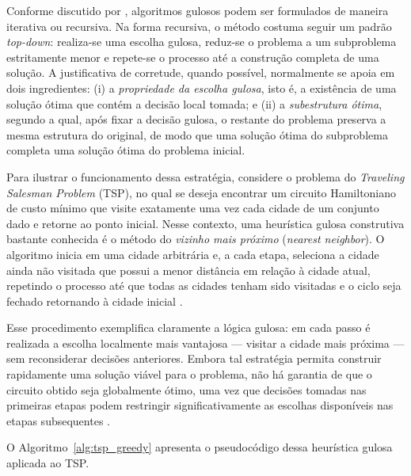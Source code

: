 Conforme discutido por \cite{Cormen2009}, algoritmos gulosos podem ser formulados de maneira iterativa ou recursiva. Na forma recursiva, o método costuma
seguir um padrão \textit{top-down}: realiza-se uma escolha gulosa, reduz-se o problema a um subproblema estritamente menor e repete-se o processo até a
construção completa de uma solução. A justificativa de corretude, quando possível, normalmente se apoia em dois ingredientes: (i) a \textit{propriedade da
escolha gulosa}, isto é, a existência de uma solução ótima que contém a decisão local tomada; e (ii) a \textit{subestrutura ótima}, segundo a qual, após
fixar a decisão gulosa, o restante do problema preserva a mesma estrutura do original, de modo que uma solução ótima do subproblema completa uma solução
ótima do problema inicial.

Para ilustrar o funcionamento dessa estratégia, considere o problema do \textit{Traveling Salesman Problem} (TSP), no qual se deseja encontrar um circuito
Hamiltoniano de custo mínimo que visite exatamente uma vez cada cidade de um conjunto dado e retorne ao ponto inicial. Nesse contexto, uma heurística gulosa
construtiva bastante conhecida é o método do \textit{vizinho mais próximo} (\textit{nearest neighbor}). O algoritmo inicia em uma cidade arbitrária e,
a cada etapa, seleciona a cidade ainda não visitada que possui a menor distância em relação à cidade atual, repetindo o processo até que todas as
cidades tenham sido visitadas e o ciclo seja fechado retornando à cidade inicial \cite{Gendreau2010}.

Esse procedimento exemplifica claramente a lógica gulosa: em cada passo é realizada a escolha localmente mais vantajosa — visitar a cidade mais próxima —
sem reconsiderar decisões anteriores. Embora tal estratégia permita construir rapidamente uma solução viável para o problema, não há garantia de que o
circuito obtido seja globalmente ótimo, uma vez que decisões tomadas nas primeiras etapas podem restringir significativamente as escolhas disponíveis
nas etapas subsequentes \cite{Gendreau2010}.

O Algoritmo~\ref{alg:tsp_greedy} apresenta o pseudocódigo dessa heurística gulosa aplicada ao TSP.

